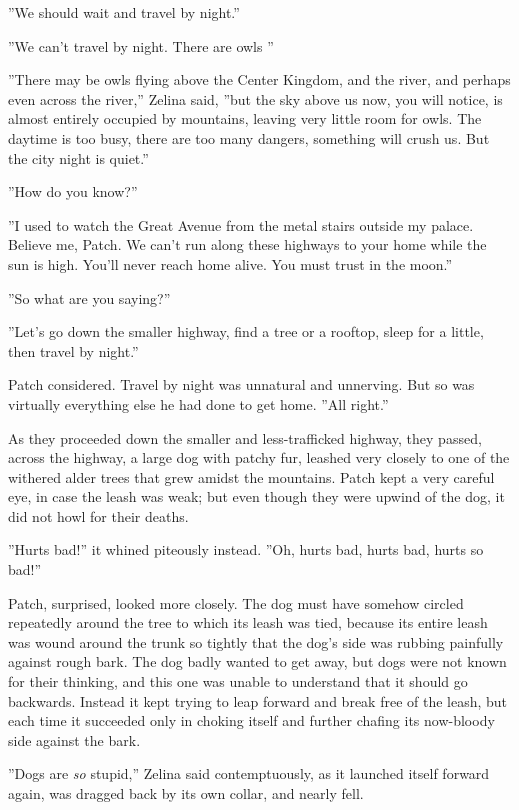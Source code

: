 \documentclass[12pt]{book}
\begin{document}
''We should wait and travel by night.''

''We can't travel by night. There are owls %
''

''There may be owls flying above the Center Kingdom, and the river, and perhaps even across the river,'' Zelina said, ''but the sky above us now, you will notice, is almost entirely occupied by mountains, leaving very little room for owls. The daytime is too busy, there are too many dangers, something will crush us. But the city night is quiet.''

''How do you know?''

''I used to watch the Great Avenue from the metal stairs outside my palace. Believe me, Patch. We can't run along these highways to your home while the sun is high. You'll never reach home alive. You must trust in the moon.''

''So what are you saying?''

''Let's go down the smaller highway, find a tree or a rooftop, sleep for a little, then travel by night.''

Patch considered. Travel by night was unnatural and unnerving. But so was virtually everything else he had done to get home. ''All right.''

As they proceeded down the smaller and less-trafficked highway, they passed, across the highway, a large dog with patchy fur, leashed very closely to one of the withered alder trees that grew amidst the mountains. Patch kept a very careful eye, in case the leash was weak; but even though they were upwind of the dog, it did not howl for their deaths.

''Hurts bad!'' it whined piteously instead. ''Oh, hurts bad, hurts bad, hurts so bad!''

Patch, surprised, looked more closely. The dog must have somehow circled repeatedly around the tree to which its leash was tied, because its entire leash was wound around the trunk so tightly that the dog's side was rubbing painfully against rough bark. The dog badly wanted to get away, but dogs were not known for their thinking, and this one was unable to understand that it should go backwards. Instead it kept trying to leap forward and break free of the leash, but each time it succeeded only in choking itself and further chafing its now-bloody side against the bark.

''Dogs are {\it so} stupid,'' Zelina said contemptuously, as it launched itself forward again, was dragged back by its own collar, and nearly fell.
\end{document}
